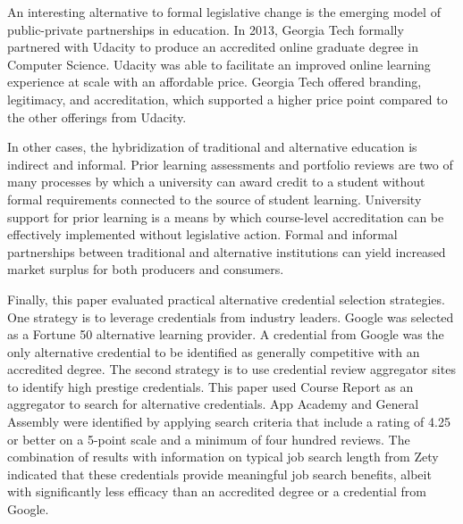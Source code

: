 \documentclass[review]{elsarticle}
\begin{document}
An interesting alternative to formal legislative change is the emerging model of public-private partnerships in education.
In 2013, Georgia Tech formally partnered with Udacity to produce an accredited online graduate degree in Computer Science\cite{empson_2013}.
Udacity was able to facilitate an improved online learning experience at scale with an affordable price.
Georgia Tech offered branding, legitimacy, and accreditation, which supported a higher price point compared to the other offerings from Udacity.

In other cases, the hybridization of traditional and alternative education is indirect and informal.
Prior learning assessments and portfolio reviews are two of many processes by which a university can award credit to a student
without formal requirements connected to the source of student learning\cite{conrad2008building}.
University support for prior learning is a means by which course-level accreditation can be effectively implemented without legislative action.
Formal and informal partnerships between traditional and alternative institutions
can yield increased market surplus for both producers and consumers.


Finally, this paper evaluated practical alternative credential selection strategies.
One strategy is to leverage credentials from industry leaders.
Google was selected as a Fortune 50 alternative learning provider.
A credential from Google was the only alternative credential to be identified as generally competitive with an accredited degree.
The second strategy is to use credential review aggregator sites to identify high prestige credentials.
This paper used Course Report as an aggregator to search for alternative credentials.
App Academy and General Assembly were identified by applying search criteria that include a rating of 4.25 or better on a 5-point scale and a minimum of four hundred reviews.
The combination of results with information on typical job search length from Zety indicated
that these credentials provide meaningful job search benefits,
albeit with significantly less efficacy than an accredited degree or a credential from Google.


\end{document}
